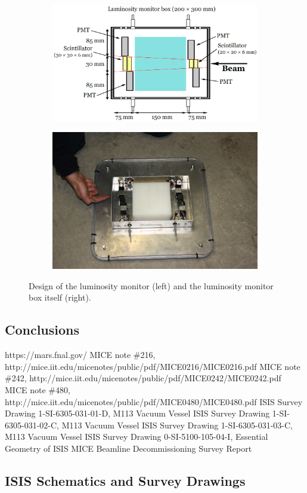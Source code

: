 \documentclass[a4paper,11pt]{article}
\begin{document}
\begin{figure}
  \begin{center}
  \begin{subfigure}
  \centering
    \includegraphics[width=0.59\columnwidth]{./figures/LM2.png}
  \end{subfigure}
  \begin{subfigure}
  \centering
    \includegraphics[width=0.39\columnwidth]{./figures/LM3.jpg}
  \end{subfigure}
  \caption{Design of the luminosity monitor (left) and the luminosity monitor box itself (right).}
  \label{fig:LM3}
  \end{center}
\end{figure}

\section{Conclusions}

\begin{thebibliography}{9}
 https://mars.fnal.gov/
 MICE note \#216, http://mice.iit.edu/micenotes/public/pdf/MICE0216/MICE0216.pdf
 MICE note \#242, http://mice.iit.edu/micenotes/public/pdf/MICE0242/MICE0242.pdf
 MICE note \#480, http://mice.iit.edu/micenotes/public/pdf/MICE0480/MICE0480.pdf
 ISIS Survey Drawing 1-SI-6305-031-01-D, M113 Vacuum Vessel
 ISIS Survey Drawing 1-SI-6305-031-02-C, M113 Vacuum Vessel
 ISIS Survey Drawing 1-SI-6305-031-03-C, M113 Vacuum Vessel
 ISIS Survey Drawing 0-SI-5100-105-04-I, Essential Geometry of ISIS
 MICE Beamline Decommissioning Survey Report


\end{thebibliography}

\begin{appendices}
\chapter{ISIS Schematics and Survey Drawings}






\end{appendices}
\end{document}
